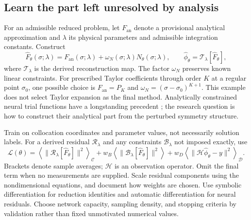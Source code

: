\documentclass[11pt]{article}
\begin{document}
\subsection{Learn the part left unresolved by analysis}
For an admissible reduced problem, let $F_{\mathrm{an}}$ denote a provisional
analytical approximation and $\lambda$ its physical parameters and admissible
integration constants. Construct
\begin{equation}
\widehat F_\theta(\sigma;\lambda)=F_{\mathrm{an}}(\sigma;\lambda)
+\omega_N(\sigma;\lambda)N_\theta(\sigma;\lambda),\qquad
\widehat\phi_\theta=\mathcal T_\lambda[\widehat F_\theta],
\label{eq:neural}
\end{equation}
where $\mathcal T_\lambda$ is the derived reconstruction map. The factor
$\omega_N$
preserves known linear constraints. For prescribed Taylor coefficients
through order $K$ at a regular point $\sigma_0$, one possible choice is
$F_{\mathrm{an}}=P_K$ and $\omega_N=(\sigma-\sigma_0)^{K+1}$.
This example does not select Taylor expansion as the final method.
Analytically constrained neural trial functions have a longstanding precedent
\cite{lagaris}; the research question is how to construct their analytical
part from the perturbed symmetry structure.

Train on collocation coordinates and parameter values, not necessarily
solution labels. For a derived residual $\mathcal R_\lambda$ and any constraints
$\mathcal B_\lambda$ not imposed exactly, use
\begin{equation}
\mathcal L(\theta)=
\left\langle\|\mathcal R_\lambda[\widehat F_\theta]\|^2\right\rangle_{\mathcal C}
+w_B\left\langle\|\mathcal B_\lambda[\widehat F_\theta]\|^2\right\rangle
+w_D\left\langle\|\mathcal H\widehat\phi_\theta-y\|^2\right\rangle_{\mathcal D}.
\end{equation}
Brackets denote sample averages; $\mathcal H$ is an observation operator.
Omit the final term when no measurements are supplied. Scale residual
components using the nondimensional equations, and document how weights
are chosen. Use symbolic differentiation for reduction identities and
automatic differentiation for neural residuals. Choose network capacity,
sampling density, and stopping criteria by validation rather than fixed
unmotivated numerical values.
\end{document}

